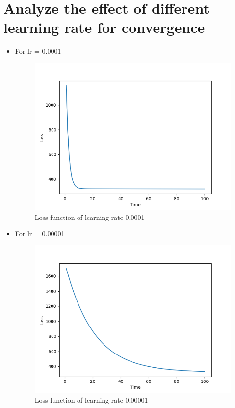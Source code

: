 \documentclass[12pt]{article}
\begin{document}
\section{Analyze the effect of different learning rate for convergence}
\begin{itemize}
    \item For lr = 0.0001
        \begin{figure}[h!]
            \centering
            \includegraphics[width=0.7\linewidth]{images/Lab2/Good.png}
            \caption{Loss function of learning rate 0.0001}
        \end{figure}

    \item For lr = 0.00001
        \begin{figure}[h!]
            \centering
            \includegraphics[width=0.7\linewidth]{images/Lab2/Small.png}
            \caption{Loss function of learning rate 0.00001}
        \end{figure}
        

\end{itemize}
\end{document}
